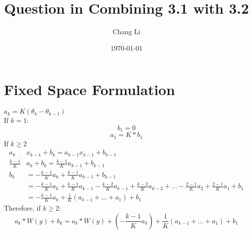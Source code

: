 \documentclass{article}
\title{Question in Combining 3.1 with 3.2}
\author{Chang Li}
\date{\today}
\begin{document}
	\maketitle
	\section{Fixed Space Formulation}
	$a_k=K(\theta_k-\theta_{k-1})$\\
	If $k =1$:
	$$
	b_1 = 0
	$$
	$$
	a_1 = K*b_1
	$$
	If $k \geq 2$
	\begin{align*}
	a_k&x_{k-1}+b_k= a_{k-1}x_{k-1}+b_{k-1}\\
	\frac{k-1}{K}&a_k+b_k=\frac{k-1}{K}a_{k-1}+b_{k-1}\\
	b_k &= -\frac{k-1}{K}a_k+\frac{k-1}{K}a_{k-1}+b_{k-1}\\
	&=-\frac{k-1}{K}a_k+\frac{k-1}{K}a_{k-1}-\frac{k-2}{K}a_{k-1}+\frac{k-2}{K}a_{k-2}+\dots-\frac{2-1}{K}a_2+\frac{2-1}{K}a_1+b_1\\
	&=-\frac{k-1}{K}a_k+\frac{1}{K}(a_{k-1}+\dots+a_1)+b_1
	\end{align*}
	Therefore, if $k \geq 2$:
	$$
	a_k*W(y)+b_k=a_k*W(y)+ (-\frac{k-1}{K}a_k)+\frac{1}{K}(a_{k-1}+\dots+a_1)+b_1
	$$
\end{document}
